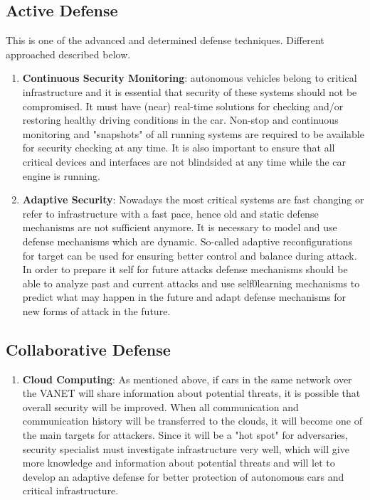 \subsection{Active Defense}
This is one of the advanced and determined defense techniques. Different approached described below.	

\begin{enumerate}
	\item \textbf{Continuous Security Monitoring}: autonomous vehicles belong to critical infrastructure and it is essential that security of these systems should not be compromised. It must have (near) real-time solutions for checking and/or restoring healthy driving conditions in the car. Non-stop and continuous monitoring and "snapshots" of all running systems are required to be available for security checking at any time. It is also important to ensure that all critical devices and interfaces are not blindsided at any time while the car engine is running.			
	\item \textbf{Adaptive Security}: Nowadays the most critical systems are fast changing or refer to infrastructure with a fast pace, hence old and static defense mechanisms are not sufficient anymore. It is necessary to model and use defense mechanisms which are dynamic. So-called adaptive reconfigurations for target can be used for ensuring better control and balance during attack. In order to prepare it self for future attacks defense mechanisms should be able to analyze past and current attacks and use self0learning mechanisms to predict what may happen in the future and adapt defense mechanisms for new forms of attack in the future.
\end{enumerate}	
		
		
\subsection{Collaborative Defense}
\begin{enumerate}
	\item \textbf{Cloud Computing}: As mentioned above, if cars in the same network over the \gls{VANET} will share information about potential threats, it is possible that overall security will be improved. When all communication and communication history will be transferred to the clouds, it will become one of the main targets for attackers. Since it will be a "hot spot" for adversaries, security specialist must investigate infrastructure very well, which will give more knowledge and information about potential threats and will let to develop an adaptive defense for better protection of autonomous cars and critical infrastructure.
\end{enumerate}

